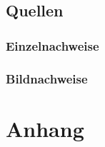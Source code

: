 \documentclass[ngerman, a4paper, justified, nobib, notoc, sfsidenotes]{tufte-book}
\begin{document}
	\chapter*{Quellen}\label{ch:sources}
	\section{Einzelnachweise}\label{sec:einzelnachweise}
	\printbibliography[keyword=sources, heading=none, title={}]
	\section{Bildnachweise}\label{sec:bildnachweise}
	\printbibliography[keyword=pictures, heading=none, title={}]
	\nocite{*}
	\thispagestyle{plain}
	
	\appendix
	\part{Anhang}
	
\end{document}
